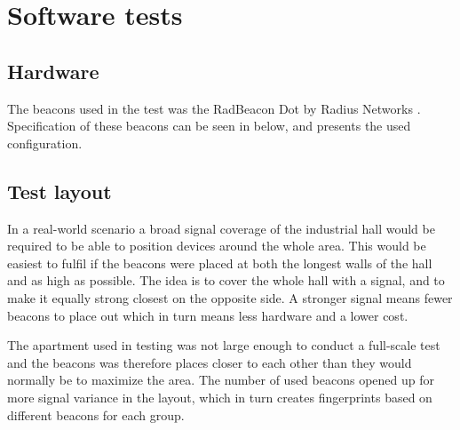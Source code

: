 \section{Software tests}\label{sec:methodSoftwareTests}


\subsection{Hardware}\label{sec:methodTestHardware}
The beacons used in the test was the RadBeacon Dot by Radius Networks \cite{RadBeaconDotDatasheet}.
Specification of these beacons can be seen in  below, and  presents the used configuration.




\subsection{Test layout}\label{sec:methodTestLayout}
In a real-world scenario a broad signal coverage of the industrial hall would be required to be able to position devices around the whole area.
This would be easiest to fulfil if the beacons were placed at both the longest walls of the hall and as high as possible.
The idea is to cover the whole hall with a signal, and to make it equally strong closest on the opposite side.
A stronger signal means fewer beacons to place out which in turn means less hardware and a lower cost.

\bigskip

The apartment used in testing was not large enough to conduct a full-scale test and the beacons was therefore places closer to each other than they would normally be to maximize the area.
The number of used beacons opened up for more signal variance in the layout, which in turn creates fingerprints based on different beacons for each group.

